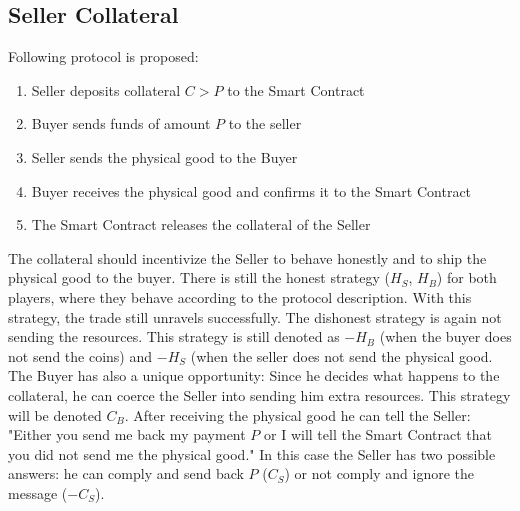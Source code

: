 \documentclass{cacthesis}
\begin{document}
\subsection{Seller Collateral}
Following protocol is proposed:
\begin{enumerate}
    \item Seller deposits collateral $C > P$ to the Smart Contract
    \item Buyer sends funds of amount $P$ to the seller 
    \item Seller sends the physical good to the Buyer
    \item Buyer receives the physical good and confirms it to the Smart Contract
    \item The Smart Contract releases the collateral of the Seller
\end{enumerate}
The collateral should incentivize the Seller to behave honestly and to ship the physical good to the buyer.
There is still the honest strategy ($H_S$, $H_B$) for both players, where they behave according to the protocol description. With this strategy, the trade still unravels successfully.\newline
The dishonest strategy is again not sending the resources. This strategy is still denoted as $-H_B$ (when the buyer does not send the coins) and $-H_S$ (when the seller does not send the physical good.\newline
The Buyer has also a unique opportunity: Since he decides what happens to the collateral, he can coerce the Seller into sending him extra resources. This strategy will be denoted $C_B$.  After receiving the physical good he can tell the Seller: "Either you send me back my payment $P$ or I will tell the Smart Contract that you did not send me the physical good." In this case the Seller has two possible answers: he can comply and send back $P$ ($C_S$) or not comply and ignore the message ($-C_S$).\newline

\end{document}
